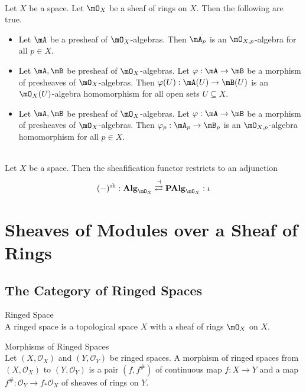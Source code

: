\documentclass[a4paper]{article}
\begin{document}
\begin{lmm}{}{}\\
Let $X$ be a space. Let $\mO_X$ be a sheaf of rings on $X$. Then the following are true. 
\begin{itemize}
\item Let $\mA$ be a presheaf of $\mO_X$-algebras. Then $\mA_p$ is an $\mO_{X,p}$-algebra for all $p\in X$. 
\item Let $\mA,\mB$ be presheaf of $\mO_X$-algebras. Let $\varphi:\mA\to\mB$ be a morphism of presheaves of $\mO_X$-algebras. Then $\varphi(U):\mA(U)\to\mB(U)$ is an $\mO_X(U)$-algebra homomorphism for all open sets $U\subseteq X$. 
\item Let $\mA,\mB$ be presheaf of $\mO_X$-algebras. Let $\varphi:\mA\to\mB$ be a morphism of presheaves of $\mO_X$-algebras. Then $\varphi_p:\mA_p\to\mB_p$ is an $\mO_{X,p}$-algebra homomorphism for all $p\in X$. 
\end{itemize}
\end{lmm}

\begin{lmm}{}{}\\
Let $X$ be a space. Then the sheafification functor restricts to an adjunction $$(-)^\text{sh}:\bold{Alg}_{\mO_X}\overset{\dashv}{\rightleftarrows}\bold{PAlg}_{\mO_X}:\iota$$
\end{lmm}

\pagebreak
\section{Sheaves of Modules over a Sheaf of Rings}
\subsection{The Category of Ringed Spaces}
\begin{defn}{Ringed Space}{}\\
A ringed space is a topological space $X$ with a sheaf of rings $\mO_X$ on $X$. 
\end{defn}

\begin{defn}{Morphisms of Ringed Spaces}{}\\
Let $(X,\mathcal{O}_X)$ and $(Y,\mathcal{O}_Y)$ be ringed spaces. A morphism of ringed spaces from $(X,\mathcal{O}_X)$ to $(Y,\mathcal{O}_Y)$ is a pair $(f,f^\#)$ of continuous map $f:X\to Y$ and a map $f^\#:\mathcal{O}_Y\to f_\ast\mathcal{O}_X$ of sheaves of rings on $Y$. 
\end{defn}
\end{document}
